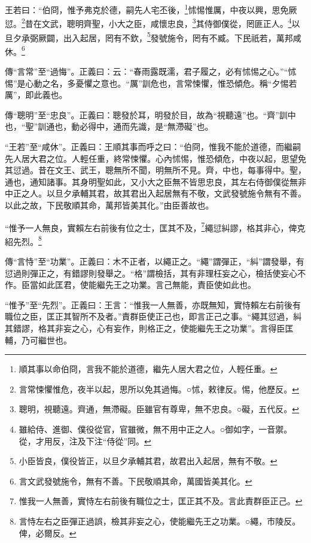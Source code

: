 王若曰：“伯冏，惟予弗克於德，嗣先人宅丕後，\footnote{順其事以命伯冏，言我不能於道德，繼先人居大君之位，人輕任重。}怵惕惟厲，中夜以興，思免厥愆。\footnote{言常悚懼惟危，夜半以起，思所以免其過悔。○怵，敕律反。惕，他歷反。}昔在文武，聰明齊聖，小大之臣，咸懷忠良，\footnote{聰明，視聽遠。齊通，無滯礙。臣雖官有尊卑，無不忠良。○礙，五代反。}其侍御僕從，罔匪正人。\footnote{雖給侍、進御、僕役從官，官雖微，無不用中正之人。○御如字，一音禦。從，才用反，注及下注“侍從”同。}以旦夕承弼厥闢，出入起居，罔有不欽，\footnote{小臣皆良，僕役皆正，以旦夕承輔其君，故君出入起居，無有不敬。}發號施令，罔有不臧。下民祇若，萬邦咸休。\footnote{言文武發號施令，無有不善。下民敬順其命，萬國皆美其化。}


{\noindent\zhuan{}\fzbyks 傳“言常”至“過悔”。正義曰：云：“春雨露既濡，君子履之，必有怵惕之心。”“怵惕”是心動之名，多憂懼之意也。“厲”訓危也，言常悚懼，惟恐傾危。稱“夕惕若厲”，即此義也。 \par}

{\noindent\zhuan{}\fzbyks 傳“聰明”至“忠良”。正義曰：聰發於耳，明發於目，故為“視聽遠”也。“齊”訓中也，“聖”訓通也，動必得中，通而先識，是“無滯礙”也。 \par}

{\noindent\shu{}\fzkt “王若”至“咸休”。正義曰：王順其事而呼之曰：“伯冏，惟我不能於道德，而繼嗣先人居大君之位。人輕任重，終常悚懼。心內怵惕，惟恐傾危，中夜以起，思望免其愆過。昔在文王、武王，聰無所不聞，明無所不見。齊，中也，每事得中。聖，通也，通知諸事。其身明聖如此，又小大之臣無不皆思忠良，其左右侍御僕從無非中正之人。以旦夕承輔其君，故其君出入起居無有不敬，文武發號施令無有不善。以此之故，下民敬順其命，萬邦皆美其化。”由臣善故也。 \par}

“惟予一人無良，實賴左右前後有位之士，匡其不及，\footnote{惟我一人無善，實恃左右前後有職位之士，匡正其不及。言此責群臣正己。}繩愆糾謬，格其非心，俾克紹先烈。\footnote{言恃左右之臣彈正過誤，檢其非妄之心，使能繼先王之功業。○繩，市陵反。俾，必爾反。}


{\noindent\zhuan{}\fzbyks 傳“言恃”至“功業”。正義曰：木不正者，以繩正之。“繩”謂彈正，“糾”謂發舉，有愆過則彈正之，有錯謬則發舉之。“格”謂檢括，其有非理枉妄之心，檢括使妄心不作。臣當如此匡君，使能繼先王之功業。言己無能，責臣使如此也。 \par}

{\noindent\shu{}\fzkt “惟予”至“先烈”。正義曰：王言：“惟我一人無善，亦既無知，實恃賴左右前後有職位之臣，匡正其智所不及者。”責群臣使正己也，即言正己之事。“繩其愆過，糾其錯謬，格其非妄之心，心有妄作，則格正之，使能繼先王之功業”。言得臣匡輔，乃可繼世也。 \par}

